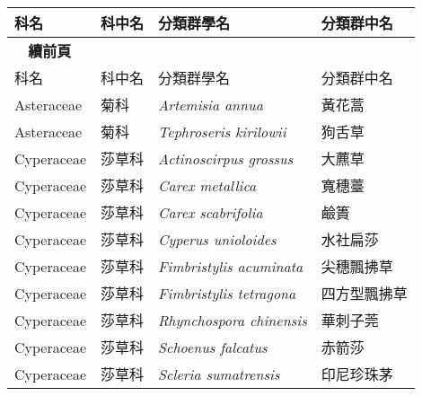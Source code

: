 {\def\arraystretch{1.5}\tabcolsep=2pt
\begin{longtable}{p{3cm}p{2cm}p{5cm}p{3cm}}
    \toprule
      科名 & 科中名 & 分類群學名 & 分類群中名  \\
    \midrule
    \endfirsthead
    {{\bfseries \tablename\ \thetable{} 續前頁 }} \\
    科名 & 科中名 & 分類群學名 & 分類群中名  \\
    \midrule
    \endhead
    Asteraceae & 菊科 & \textit{Artemisia annua}  \index{Artemisia@\textit{Artemisia}!annua@\textit{annua}}               & 黃花蒿 \index{黃花蒿} \\
    Asteraceae & 菊科 & \textit{Tephroseris kirilowii}  \index{Tephroseris@\textit{Tephroseris}!kirilowii@\textit{kirilowii}}         & 狗舌草 \index{狗舌草} \\
    Cyperaceae & 莎草科 & \textit{Actinoscirpus grossus}  \index{Actinoscirpus@\textit{Actinoscirpus}!grossus@\textit{grossus}}       & 大藨草 \index{大藨草} \\
    Cyperaceae & 莎草科 & \textit{Carex metallica}  \index{Carex@\textit{Carex}!metallica@\textit{metallica}}             & 寬穗薹 \index{寬穗薹} \\
    Cyperaceae & 莎草科 & \textit{Carex scabrifolia}  \index{Carex@\textit{Carex}!scabrifolia@\textit{scabrifolia}}           & 鹼簣 \index{鹼簣} \\
    Cyperaceae & 莎草科 & \textit{Cyperus unioloides}  \index{Cyperus@\textit{Cyperus}!unioloides@\textit{unioloides}}          & 水社扁莎 \index{水社扁莎} \\
    Cyperaceae & 莎草科 & \textit{Fimbristylis acuminata}  \index{Fimbristylis@\textit{Fimbristylis}!acuminata@\textit{acuminata}}      & 尖穗飄拂草 \index{尖穗飄拂草} \\
    Cyperaceae & 莎草科 & \textit{Fimbristylis tetragona}  \index{Fimbristylis@\textit{Fimbristylis}!tetragona@\textit{tetragona}}      & 四方型飄拂草 \index{四方型飄拂草} \\
    Cyperaceae & 莎草科 & \textit{Rhynchospora chinensis}  \index{Rhynchospora@\textit{Rhynchospora}!chinensis@\textit{chinensis}}      & 華刺子莞 \index{華刺子莞} \\
    Cyperaceae & 莎草科 & \textit{Schoenus falcatus}  \index{Schoenus@\textit{Schoenus}!falcatus@\textit{falcatus}}           & 赤箭莎 \index{赤箭莎} \\
    Cyperaceae & 莎草科 & \textit{Scleria sumatrensis}  \index{Scleria@\textit{Scleria}!sumatrensis@\textit{sumatrensis}}         & 印尼珍珠茅 \index{印尼珍珠茅} \\

\end{longtable}}
